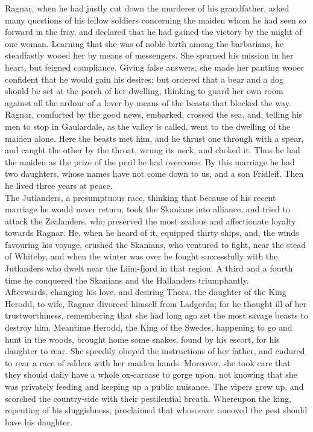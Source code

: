 \documentclass[10pt,a4paper]{report}
\begin{document}
Ragnar, when he had justly cut down the murderer of his grandfather, asked many questions of his fellow soldiers concerning the maiden whom he had seen so forward in the fray, and declared that he had gained the victory by the might of one woman. Learning that she was of noble birth among the barbarians, he steadfastly wooed her by means of messengers. She spurned his mission in her heart, but feigned compliance. Giving false answers, she made her panting wooer confident that he would gain his desires; but ordered that a bear and a dog should be set at the porch of her dwelling, thinking to guard her own room against all the ardour of a lover by means of the beasts that blocked the way. Ragnar, comforted by the good news, embarked, crossed the sea, and, telling his men to stop in Gaulardale, as the valley is called, went to the dwelling of the maiden alone. Here the beasts met him, and he thrust one through with a spear, and caught the other by the throat, wrung its neck, and choked it. Thus he had the maiden as the prize of the peril he had overcome. By this marriage he had two daughters, whose names have not come down to us, and a son Fridleif. Then he lived three years at peace.\\

The Jutlanders, a presumptuous race, thinking that because of his recent marriage he would never return, took the Skanians into alliance, and tried to attack the Zealanders, who preserved the most zealous and affectionate loyalty towards Ragnar. He, when he heard of it, equipped thirty ships, and, the winds favouring his voyage, crushed the Skanians, who ventured to fight, near the stead of Whiteby, and when the winter was over he fought successfully with the Jutlanders who dwelt near the Liim-fjord in that region. A third and a fourth time he conquered the Skanians and the Hallanders triumphantly.\\

Afterwards, changing his love, and desiring Thora, the daughter of the King Herodd, to wife, Ragnar divorced himself from Ladgerda; for he thought ill of her trustworthiness, remembering that she had long ago set the most savage beasts to destroy him. Meantime Herodd, the King of the Swedes, happening to go and hunt in the woods, brought home some snakes, found by his escort, for his daughter to rear. She speedily obeyed the instructions of her father, and endured to rear a race of adders with her maiden hands. Moreover, she took care that they should daily have a whole ox-carcase to gorge upon, not knowing that she was privately feeding and keeping up a public nuisance. The vipers grew up, and scorched the country-side with their pestilential breath. Whereupon the king, repenting of his sluggishness, proclaimed that whosoever removed the pest should have his daughter.\\
\end{document}
